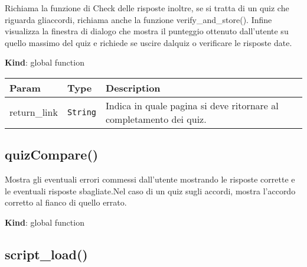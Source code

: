 Richiama la funzione di Check delle risposte inoltre, se si tratta di un
quiz che riguarda gliaccordi, richiama anche la funzione
verify\_and\_store(). Infine visualizza la finestra di dialogo che
mostra il punteggio ottenuto dall'utente su quello massimo del quiz e
richiede se uscire dalquiz o verificare le risposte date.

\textbf{Kind}: global function

\begin{tabularx}{\textwidth}{XXX}
\toprule
\begin{minipage}[b]{0.30\columnwidth}\raggedright
Param\strut
\end{minipage} & \begin{minipage}[b]{0.30\columnwidth}\raggedright
Type\strut
\end{minipage} & \begin{minipage}[b]{0.30\columnwidth}\raggedright
Description\strut
\end{minipage}\tabularnewline
\midrule
\endhead
\begin{minipage}[t]{0.30\columnwidth}\raggedright
return\_link\strut
\end{minipage} & \begin{minipage}[t]{0.30\columnwidth}\raggedright
\texttt{String}\strut
\end{minipage} & \begin{minipage}[t]{0.30\columnwidth}\raggedright
Indica in quale pagina si deve ritornare al completamento dei
quiz.\strut
\end{minipage}\tabularnewline
\bottomrule
\end{tabularx}

\protect\hypertarget{quizCompare}{}{}

\hypertarget{quizcompare}{%
\subsection{quizCompare()}\label{quizcompare}}

Mostra gli eventuali errori commessi dall'utente mostrando le risposte
corrette e le eventuali risposte sbagliate.Nel caso di un quiz sugli
accordi, mostra l'accordo corretto al fianco di quello errato.

\textbf{Kind}: global function\\
\protect\hypertarget{script_load}{}{}

\hypertarget{script_load}{%
\subsection{script\_load()}\label{script_load}}

